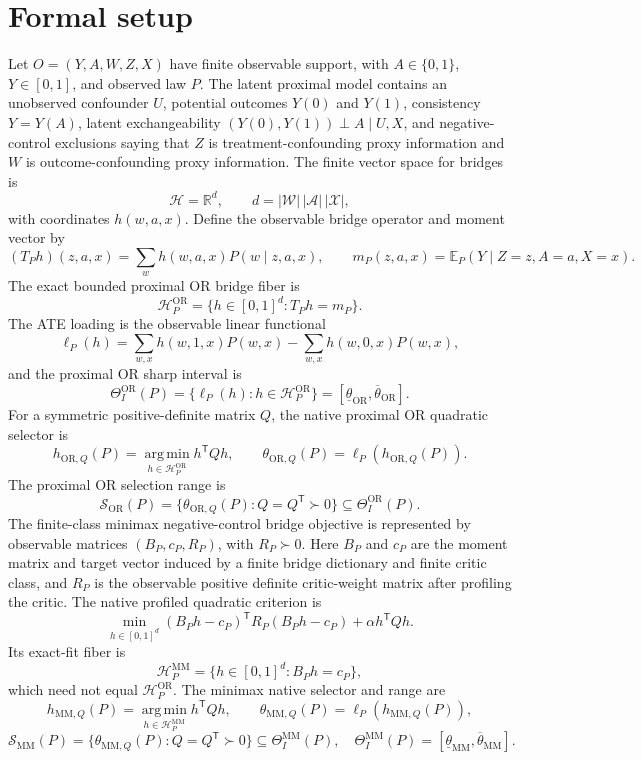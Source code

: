 \documentclass[11pt]{article}
\newcommand{\E}{\mathbb{E}}
\newcommand{\transpose}{\mathsf{T}}
\newcommand{\calH}{\mathcal{H}}
\newcommand{\R}{\mathbb{R}}
\theoremstyle{definition}
\theoremstyle{plain}
\theoremstyle{remark}
\begin{document}
\section{Formal setup}
Let \(O=(Y,A,W,Z,X)\) have finite observable support, with
\(A\in\{0,1\}\), \(Y\in[0,1]\), and observed law \(P\).  The latent proximal
model contains an unobserved confounder \(U\), potential outcomes \(Y(0)\)
and \(Y(1)\), consistency \(Y=Y(A)\), latent exchangeability
\((Y(0),Y(1))\perp A\mid U,X\), and negative-control exclusions saying that
\(Z\) is treatment-confounding proxy information and \(W\) is
outcome-confounding proxy information.  The finite vector space for bridges is
\[
\calH=\R^d,\qquad
d=|\mathcal W|\,|\mathcal A|\,|\mathcal X|,
\]
with coordinates \(h(w,a,x)\).  Define the observable bridge operator and
moment vector by
\[
(T_Ph)(z,a,x)=\sum_w h(w,a,x)P(w\mid z,a,x),\qquad
m_P(z,a,x)=\E_P(Y\mid Z=z,A=a,X=x).
\]
The exact bounded proximal OR bridge fiber is
\[
\calH_P^{\mathrm{OR}}=\{h\in[0,1]^d:T_Ph=m_P\}.
\]
The ATE loading is the observable linear functional
\[
\ell_P(h)=\sum_{w,x} h(w,1,x)P(w,x)-\sum_{w,x}h(w,0,x)P(w,x),
\]
and the proximal OR sharp interval is
\[
\Theta_I^{\mathrm{OR}}(P)=\{\ell_P(h):h\in\calH_P^{\mathrm{OR}}\}
=[\underline\theta_{\mathrm{OR}},\overline\theta_{\mathrm{OR}}].
\]
For a symmetric positive-definite matrix \(Q\), the native proximal OR
quadratic selector is
\[
h_{\mathrm{OR},Q}(P)=
\operatorname*{arg\,min}_{h\in\calH_P^{\mathrm{OR}}}h^\transpose Qh,\qquad
\theta_{\mathrm{OR},Q}(P)=\ell_P(h_{\mathrm{OR},Q}(P)).
\]
The proximal OR selection range is
\[
\mathcal S_{\mathrm{OR}}(P)=
\{\theta_{\mathrm{OR},Q}(P):Q=Q^\transpose\succ0\}
\subseteq\Theta_I^{\mathrm{OR}}(P).
\]
The finite-class minimax negative-control bridge objective is represented by
observable matrices \((B_P,c_P,R_P)\), with \(R_P\succ0\).  Here \(B_P\) and
\(c_P\) are the moment matrix and target vector induced by a finite bridge
dictionary and finite critic class, and \(R_P\) is the observable positive
definite critic-weight matrix after profiling the critic.  The native
profiled quadratic criterion is
\[
\min_{h\in[0,1]^d}(B_Ph-c_P)^\transpose R_P(B_Ph-c_P)+\alpha h^\transpose Qh.
\]
Its exact-fit fiber is
\[
\calH_P^{\mathrm{MM}}=\{h\in[0,1]^d:B_Ph=c_P\},
\]
which need not equal \(\calH_P^{\mathrm{OR}}\).  The minimax native selector
and range are
\[
h_{\mathrm{MM},Q}(P)=
\operatorname*{arg\,min}_{h\in\calH_P^{\mathrm{MM}}}h^\transpose Qh,\qquad
\theta_{\mathrm{MM},Q}(P)=\ell_P(h_{\mathrm{MM},Q}(P)),
\]
\[
\mathcal S_{\mathrm{MM}}(P)=
\{\theta_{\mathrm{MM},Q}(P):Q=Q^\transpose\succ0\}
\subseteq\Theta_I^{\mathrm{MM}}(P),
\quad
\Theta_I^{\mathrm{MM}}(P)=
[\underline\theta_{\mathrm{MM}},\overline\theta_{\mathrm{MM}}].
\]
\end{document}
